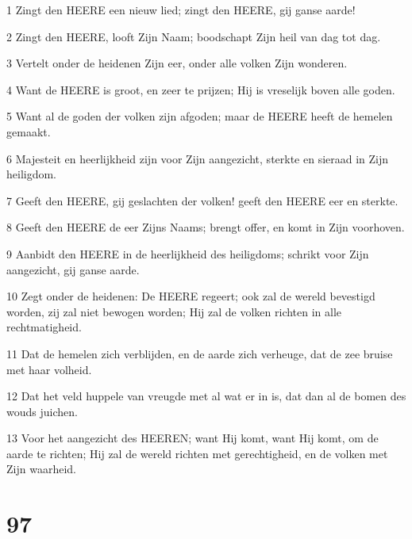 \par 1 Zingt den HEERE een nieuw lied; zingt den HEERE, gij ganse aarde!
\par 2 Zingt den HEERE, looft Zijn Naam; boodschapt Zijn heil van dag tot dag.
\par 3 Vertelt onder de heidenen Zijn eer, onder alle volken Zijn wonderen.
\par 4 Want de HEERE is groot, en zeer te prijzen; Hij is vreselijk boven alle goden.
\par 5 Want al de goden der volken zijn afgoden; maar de HEERE heeft de hemelen gemaakt.
\par 6 Majesteit en heerlijkheid zijn voor Zijn aangezicht, sterkte en sieraad in Zijn heiligdom.
\par 7 Geeft den HEERE, gij geslachten der volken! geeft den HEERE eer en sterkte.
\par 8 Geeft den HEERE de eer Zijns Naams; brengt offer, en komt in Zijn voorhoven.
\par 9 Aanbidt den HEERE in de heerlijkheid des heiligdoms; schrikt voor Zijn aangezicht, gij ganse aarde.
\par 10 Zegt onder de heidenen: De HEERE regeert; ook zal de wereld bevestigd worden, zij zal niet bewogen worden; Hij zal de volken richten in alle rechtmatigheid.
\par 11 Dat de hemelen zich verblijden, en de aarde zich verheuge, dat de zee bruise met haar volheid.
\par 12 Dat het veld huppele van vreugde met al wat er in is, dat dan al de bomen des wouds juichen.
\par 13 Voor het aangezicht des HEEREN; want Hij komt, want Hij komt, om de aarde te richten; Hij zal de wereld richten met gerechtigheid, en de volken met Zijn waarheid.

\chapter{97}

